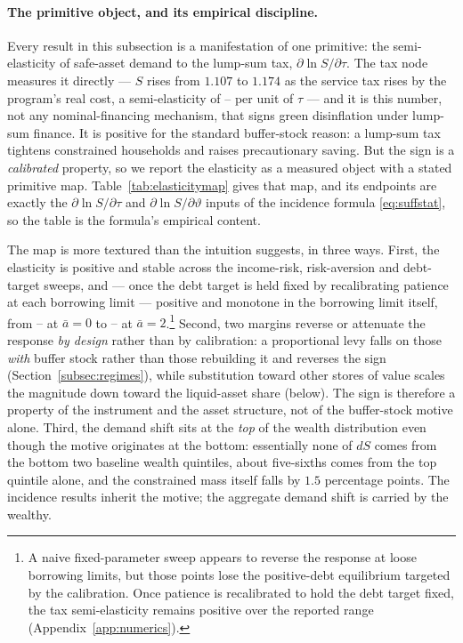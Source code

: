 \documentclass[12pt]{article}
\providecommand{\pendingnum}{\textit{--}}
\providecommand{\epsTau}{\pendingnum}\providecommand{\epsLevy}{\pendingnum}
\providecommand{\epsAbarRecalLo}{\pendingnum}\providecommand{\epsAbarRecalHi}{\pendingnum}
\newcommand{\Sfun}{S}
\begin{document}
\paragraph{The primitive object, and its empirical discipline.} Every result
in this subsection is a manifestation of one primitive: the semi-elasticity of
safe-asset demand to the lump-sum tax, $\partial\ln\Sfun/\partial\tau$. The
tax node measures it directly --- $\Sfun$ rises from $1.107$ to $1.174$ as the
service tax rises by the program's real cost, a semi-elasticity of $\epsTau$
per unit of $\tau$ --- and it is this number, not any nominal-financing
mechanism, that signs green disinflation under lump-sum finance. It is
positive for the standard buffer-stock reason: a lump-sum tax tightens
constrained households and raises precautionary saving. But the sign is a
\emph{calibrated} property, so we report the elasticity as a measured object
with a stated primitive map. Table~\ref{tab:elasticitymap} gives that map,
and its endpoints are exactly the $\partial\ln\Sfun/\partial\tau$ and
$\partial\ln\Sfun/\partial\vartheta$ inputs of the incidence formula
\eqref{eq:suffstat}, so the table is the formula's empirical content.

The map is more textured than the intuition suggests, in three ways. First,
the elasticity is positive and stable across the income-risk, risk-aversion
and debt-target sweeps, and --- once the debt target is held fixed by
recalibrating patience at each borrowing limit --- positive and monotone in
the borrowing limit itself, from $\epsAbarRecalLo$ at $\bar a=0$ to
$\epsAbarRecalHi$ at $\bar a=2$.\footnote{A naive fixed-parameter sweep
appears to reverse the response at loose borrowing limits, but those points
lose the positive-debt equilibrium targeted by the calibration. Once patience
is recalibrated to hold the debt target fixed, the tax semi-elasticity
remains positive over the reported range
(Appendix~\ref{app:numerics}).} Second, two
margins reverse or attenuate the response \emph{by design} rather than by
calibration: a proportional levy falls on those \emph{with} buffer stock
rather than those rebuilding it and reverses the sign
(Section~\ref{subsec:regimes}), while substitution toward other stores of
value scales the magnitude down toward the liquid-asset share (below). The
sign is therefore a property of the instrument and the asset structure, not
of the buffer-stock motive alone. Third, the demand shift sits at the
\emph{top} of the wealth distribution even though the motive originates at
the bottom: essentially none of $d\Sfun$ comes from the bottom two baseline
wealth quintiles, about five-sixths comes from the top quintile alone, and
the constrained mass itself falls by $1.5$ percentage points. The incidence
results inherit the motive; the aggregate demand shift is carried by the
wealthy.
\end{document}
